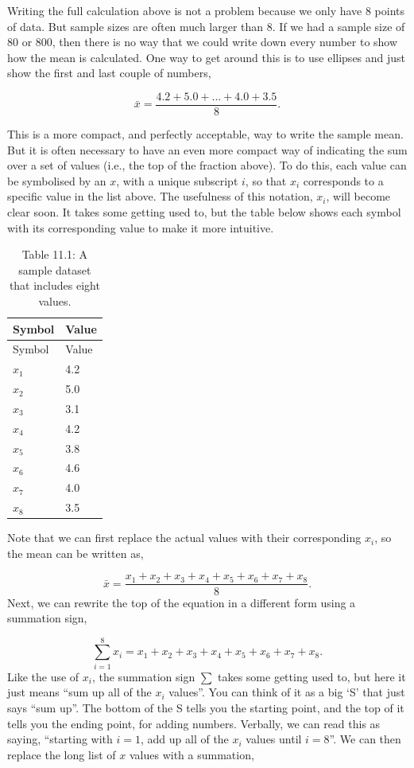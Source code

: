 \documentclass[
]{scrbook}
\begin{document}
Writing the full calculation above is not a problem because we only have 8 points of data.
But sample sizes are often much larger than 8.
If we had a sample size of 80 or 800, then there is no way that we could write down every number to show how the mean is calculated.
One way to get around this is to use ellipses and just show the first and last couple of numbers,

\[\bar{x} = \frac{4.2 + 5.0 + ... + 4.0 + 3.5}{8}.\]

This is a more compact, and perfectly acceptable, way to write the sample mean.
But it is often necessary to have an even more compact way of indicating the sum over a set of values (i.e., the top of the fraction above).
To do this, each value can be symbolised by an \(x\), with a unique subscript \(i\), so that \(x_{i}\) corresponds to a specific value in the list above.
The usefulness of this notation, \(x_{i}\), will become clear soon.
It takes some getting used to, but the table below shows each symbol with its corresponding value to make it more intuitive.

\begin{longtable}[]{@{}ll@{}}
\caption{Table 11.1: A sample dataset that includes eight values.}\tabularnewline
\toprule
Symbol & Value \\
\midrule
\endfirsthead
\toprule
Symbol & Value \\
\midrule
\endhead
\(x_{1}\) & 4.2 \\
\(x_{2}\) & 5.0 \\
\(x_{3}\) & 3.1 \\
\(x_{4}\) & 4.2 \\
\(x_{5}\) & 3.8 \\
\(x_{6}\) & 4.6 \\
\(x_{7}\) & 4.0 \\
\(x_{8}\) & 3.5 \\
\bottomrule
\end{longtable}

Note that we can first replace the actual values with their corresponding \(x_{i}\), so the mean can be written as,

\[\bar{x} = \frac{x_{1} + x_{2} + x_{3} + x_{4} + x_{5} + x_{6} + x_{7} + x_{8}}{8}.\]
Next, we can rewrite the top of the equation in a different form using a summation sign,

\[\sum_{i = 1}^{8}x_{i} = x_{1} + x_{2} + x_{3} + x_{4} + x_{5} + x_{6} + x_{7} + x_{8}.\]
Like the use of \(x_{i}\), the summation sign \(\sum\) takes some getting used to, but here it just means ``sum up all of the \(x_{i}\) values''.
You can think of it as a big `S' that just says ``sum up''.
The bottom of the S tells you the starting point, and the top of it tells you the ending point, for adding numbers.
Verbally, we can read this as saying, ``starting with \(i = 1\), add up all of the \(x_{i}\) values until \(i = 8\)''.
We can then replace the long list of \(x\) values with a summation,
\end{document}
